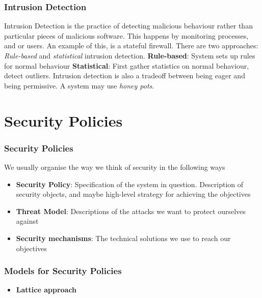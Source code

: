 \documentclass[14pt]{beamer}
\begin{document}
    \begin{frame}
        \frametitle{Intrusion Detection}
            Intrusion Detection is the practice of detecting malicious behaviour rather than particular pieces of malicious software. This happens by monitoring processes, and or users. 
            An example of this, is a stateful firewall. There are two approaches: \textit{Rule-based} and \textit{statistical} intrusion detection. 
            \textbf{Rule-based}: System sets up rules for normal behaviour
            \textbf{Statistical}: First gather statistics on normal behaviour, detect outliers. 
            Intrusion detection is also a tradeoff between being eager and being permissive. 
            A system may use \textit{honey pots}. 
    \end{frame}

\section{Security Policies}
    \begin{frame}
        \frametitle{Security Policies}
            We usually organise the way we think of security in the following ways
            \begin{itemize}
                \item \textbf{Security Policy}: Specification of the system in question. Description of security objects, and maybe high-level strategy for achieving the objectives 
                \item \textbf{Threat Model}: Descriptions of the attacks we want to protect ourselves against
                \item \textbf{Security mechanisms}: The technical solutions we use to reach our objectives
            \end{itemize}
    \end{frame}

    \begin{frame}
        \frametitle{Models for Security Policies}
            \begin{itemize}
                \item \textbf{Lattice approach}
            \end{itemize}
    \end{frame}
\end{document}
